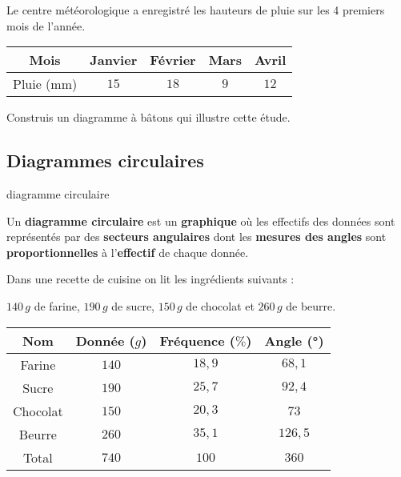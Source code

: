 \begin{pageAD}


Le centre météorologique a enregistré les hauteurs de pluie sur les 4 premiers mois de l'année.

 \begin{center}
 \begin{tabular}{|c|c|c|c|c|}\hline 
  Mois & Janvier & Février & Mars & Avril \\\hline 
  Pluie (mm)& $15$ & $18$ & $9$ & $12$ \\\hline
 \end{tabular}
 \end{center}

Construis un diagramme à bâtons qui illustre cette étude.




\end{pageAD}



\begin{pageCours} 

\section{Diagrammes circulaires}
\begin{DefT}{diagramme circulaire}

Un \textbf{diagramme circulaire} est un \textbf{graphique} où les effectifs des données sont représentés par des \textbf{secteurs angulaires} dont les \textbf{mesures des angles} sont \textbf{proportionnelles} à l'\textbf{effectif} de chaque donnée. 

\end{DefT}

\begin{Ex}

Dans une recette de cuisine on lit les ingrédients suivants :

$140\,g$ de farine, $190\,g$ de sucre, $150\,g$ de chocolat et $260\,g$ de beurre.

\begin{tabular}{|c|c|c|c|}\hline
Nom & Donnée ($g$) & Fréquence ($\%$) & Angle (°) \\\hline
Farine & $140$ & $18,9$ & $68,1$ \\\hline
Sucre & $190$ & $25,7$ & $92,4$ \\\hline
Chocolat & $150$ & $20,3$ & $73$ \\\hline
Beurre & $260$ & $35,1$ & $126,5$ \\\hline
Total & $740$ & $100$ & $360$ \\\hline
\end{tabular}


\end{Ex}


\end{pageCours}






